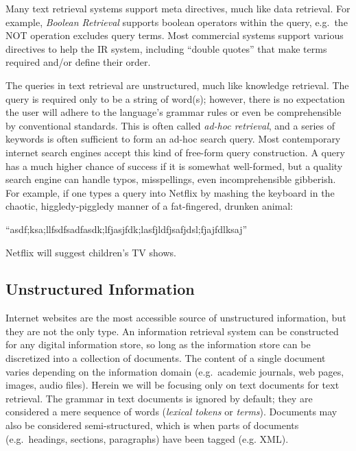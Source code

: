 Many text retrieval systems support meta directives, much like data retrieval. For example, \textit{Boolean Retrieval} supports boolean operators within the query, e.g.\ the NOT operation excludes query terms. Most commercial systems support various directives to help the IR system, including ``double quotes'' that make terms required and/or define their order.

The queries in text retrieval are unstructured, much like knowledge retrieval. The query is required only to be a string of word(s); however, there is no expectation the user will adhere to the language's grammar rules or even be comprehensible by conventional standards. This is often called \textit{ad-hoc retrieval}, and a series of keywords is often sufficient to form an ad-hoc search query. Most contemporary internet search engines accept this kind of free-form query construction. A query has a much higher chance of success if it is somewhat well-formed, but a quality search engine can handle typos, misspellings, even incomprehensible gibberish. For example, if one types a query into Netflix by mashing the keyboard in the chaotic, higgledy-piggledy manner of a fat-fingered, drunken animal:

\begin{center}
    ``asdf;ksa;llfsdfsadfasdk;lfjasjfdk;lasfjldfjsafjdsl;fjajfdlksaj''
\end{center}

\noindent
Netflix will suggest children’s TV shows.



\subsection{Unstructured Information}
Internet websites are the most accessible source of unstructured information, but they are not the only type. An information retrieval system can be constructed for any digital information store, so long as the information store can be discretized into a collection of documents. The content of a single document varies depending on the information domain (e.g.\ academic journals, web pages, images, audio files). Herein we will be focusing only on text documents for text retrieval. The grammar in text documents is ignored by default; they are considered a mere sequence of words (\textit{lexical tokens} or \textit{terms}). Documents may also be considered semi-structured, which is when parts of documents (e.g.\ headings, sections, paragraphs) have been tagged (e.g. XML).

